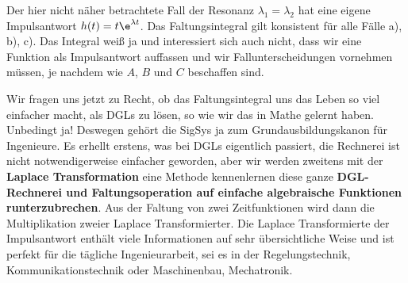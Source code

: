 Der hier nicht näher betrachtete Fall der Resonanz $\lambda_1 = \lambda_2$
hat eine eigene Impulsantwort $h(t) = t \e^{\lambda t}$.
%
Das Faltungsintegral gilt konsistent
für alle Fälle a), b), c). Das Integral weiß ja und interessiert sich auch nicht,
dass wir eine Funktion als Impulsantwort auffassen und wir Fallunterscheidungen
vornehmen müssen, je nachdem wie $A$, $B$ und $C$ beschaffen sind.

Wir fragen uns jetzt zu Recht, ob das Faltungsintegral
uns das Leben so viel einfacher macht, als DGLs zu lösen, so wie wir das in Mathe
gelernt haben.
%
Unbedingt ja! Deswegen gehört die SigSys ja zum Grundausbildungskanon für Ingenieure.
Es erhellt erstens, was bei DGLs eigentlich passiert, die Rechnerei
ist nicht notwendigerweise einfacher geworden, aber wir werden zweitens mit der
\textbf{Laplace Transformation} eine
Methode kennenlernen diese ganze \textbf{DGL-Rechnerei und Faltungsoperation auf
einfache algebraische Funktionen runterzubrechen}. Aus der Faltung von zwei
Zeitfunktionen wird dann die Multiplikation zweier Laplace Transformierter.
%
Die Laplace Transformierte der Impulsantwort enthält viele Informationen auf
sehr übersichtliche Weise und ist perfekt für die tägliche Ingenieurarbeit, sei
es in der Regelungstechnik, Kommunikationstechnik oder Maschinenbau, Mechatronik.



